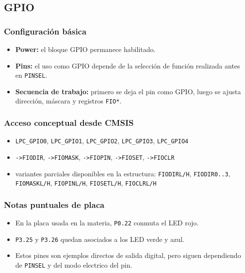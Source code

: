 \subsection{GPIO}

\subsubsection{Configuración básica}
\begin{itemize}
  \item \textbf{Power:} el bloque GPIO permanece habilitado.
  \item \textbf{Pins:} el uso como GPIO depende de la selección de función realizada antes en \texttt{PINSEL}.
  \item \textbf{Secuencia de trabajo:} primero se deja el pin como GPIO, luego se ajusta dirección, máscara y registros \texttt{FIO*}.
\end{itemize}

\subsubsection{Acceso conceptual desde CMSIS}
\begin{itemize}
  \item \texttt{LPC\_GPIO0}, \texttt{LPC\_GPIO1}, \texttt{LPC\_GPIO2}, \texttt{LPC\_GPIO3}, \texttt{LPC\_GPIO4}
  \item \texttt{->FIODIR}, \texttt{->FIOMASK}, \texttt{->FIOPIN}, \texttt{->FIOSET}, \texttt{->FIOCLR}
  \item variantes parciales disponibles en la estructura: \texttt{FIODIRL/H}, \texttt{FIODIR0..3}, \texttt{FIOMASKL/H}, \texttt{FIOPINL/H}, \texttt{FIOSETL/H}, \texttt{FIOCLRL/H}
\end{itemize}

\subsubsection{Notas puntuales de placa}
\begin{itemize}
  \item En la placa usada en la materia, \texttt{P0.22} conmuta el LED rojo.
  \item \texttt{P3.25} y \texttt{P3.26} quedan asociados a los LED verde y azul.
  \item Estos pines son ejemplos directos de salida digital, pero siguen dependiendo de \texttt{PINSEL} y del modo electrico del pin.
\end{itemize}

